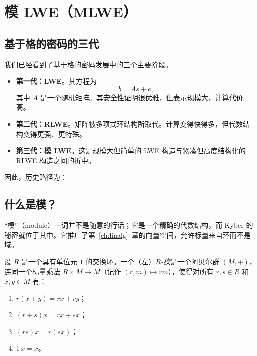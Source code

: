 \chapter{模 LWE（MLWE）}
\label{ch:mlwe}

\section{基于格的密码的三代}

我们已经看到了基于格的密码发展中的三个主要阶段。

\begin{itemize}
    \item \textbf{第一代：LWE}。其方程为
    \[
    b = A s + e,
    \]
    其中 $A$ 是一个随机矩阵。其安全性证明很优雅，但表示规模大，计算代价高。

    \item \textbf{第二代：RLWE}。矩阵被多项式环结构所取代。计算变得快得多，但代数结构变得更强、更特殊。

    \item \textbf{第三代：模 LWE}。这是规模大但简单的 LWE 构造与紧凑但高度结构化的 RLWE 构造之间的折中。
\end{itemize}

因此，历史路径为：

\begin{center}
\end{center}

\section{什么是模？}

“模”（module）一词并不是随意的行话；它是一个精确的代数结构，而 Kyber 的秘密就位于其中。它推广了第~\ref{ch:linalg}~章的向量空间，允许标量来自环而不是域。

\begin{definition}[环上的模]
设 $R$ 是一个具有单位元 $1$ 的交换环。一个（左）\emph{$R$-模}是一个阿贝尔群 $(M,+)$，连同一个标量乘法 $R\times M\to M$（记作 $(r,m)\mapsto rm$），使得对所有 $r,s\in R$ 和 $x,y\in M$ 有：
\begin{enumerate}
  \item $r(x+y)=rx+ry$；
  \item $(r+s)x=rx+sx$；
  \item $(rs)x=r(sx)$；
  \item $1\,x=x$。
\end{enumerate}
\end{definition}

